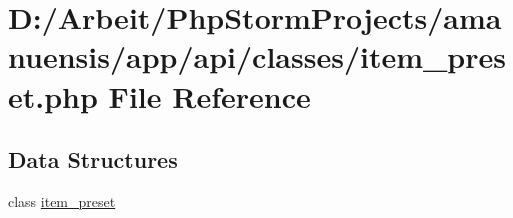 \hypertarget{a00064}{}\section{D\+:/\+Arbeit/\+Php\+Storm\+Projects/amanuensis/app/api/classes/item\+\_\+preset.php File Reference}
\label{a00064}
\subsection*{Data Structures}
\begin{DoxyCompactItemize}
\item 
class \hyperlink{a00028}{item\+\_\+preset}
\end{DoxyCompactItemize}
